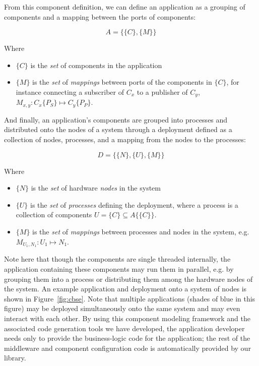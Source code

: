 From this component definition, we can define an application as a
grouping of components and a mapping between the ports of components:

\begin{equation}
  A = \{\{C\},\{M\}\}
\end{equation}

Where

\begin{itemize}
\item $\{C\}$ is the \emph{set} of components in the application
\item $\{M\}$ is the \emph{set} of \emph{mappings} between ports of
  the components in $\{C\}$, for instance connecting a subscriber of
  $C_x$ to a publisher of $C_y$, $M_{x,y} : C_x\{P_S\}\mapsto
  C_y\{P_P\}$.
\end{itemize}

And finally, an application's components are grouped into processes
and distributed onto the nodes of a system through a deployment
defined as a collection of nodes, processes, and a mapping from the
nodes to the processes:

\begin{equation}
  D = \{\{N\},\{U\},\{M\}\}
\end{equation}

Where

\begin{itemize}
\item $\{N\}$ is the \emph{set} of hardware \emph{nodes} in the system
\item $\{U\}$ is the \emph{set} of \emph{processes} defining the deployment,
  where a process is a collection of components
  $U=\{C\}\subseteq A\{\{C\}\}$.
\item $\{M\}$ is the \emph{set} of \emph{mappings} between processes and nodes
  in the system, e.g. $M_{U_1,N_1} : U_1\mapsto N_1$.
\end{itemize}

Note here that though the components are single threaded internally,
the application containing these components may run them in parallel,
e.g. by grouping them into a process or distributing them among the
hardware nodes of the system.  An example application and deployment
onto a system of nodes is shown in Figure~\ref{fig:cbse}.  Note that
multiple applications (shades of blue in this figure) may be deployed
simultaneously onto the same system and may even interact with each
other.  By using this component modeling framework and the associated
code generation tools we have developed, the application developer
needs only to provide the business-logic code for the application; the
rest of the middleware and component configuration code is
automatically provided by our library.

